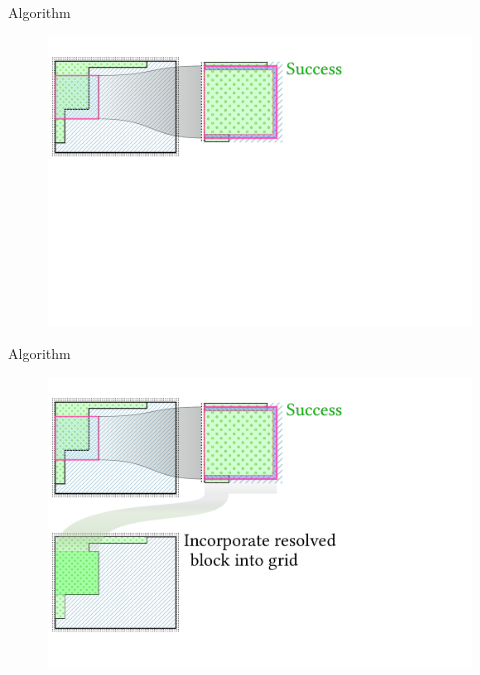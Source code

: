 \documentclass{beamer}
\begin{document}
  \begin{frame}[fragile]{Algorithm}
    \begin{figure}
      \includegraphics[width=\textwidth]{figs/poms_alg4.pdf}
    \end{figure}
  \end{frame}

  \begin{frame}[fragile]{Algorithm}
    \begin{figure}
      \includegraphics[width=\textwidth]{figs/poms_alg4_5.pdf}
    \end{figure}
  \end{frame}
\end{document}
